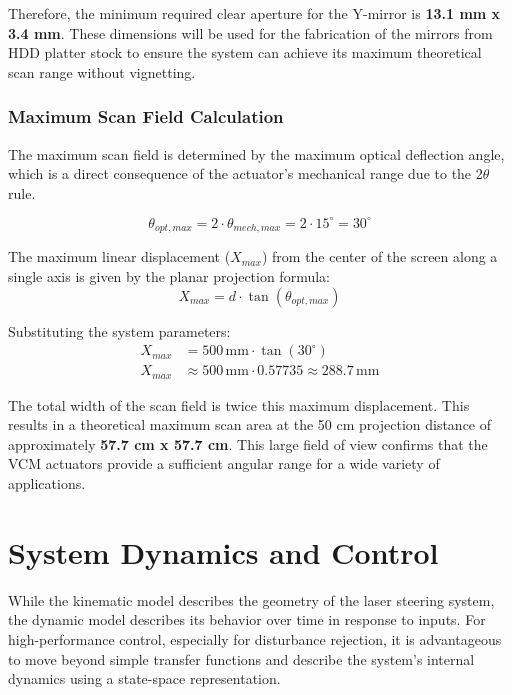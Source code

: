 \documentclass[12pt]{article}
\begin{document}
Therefore, the minimum required clear aperture for the Y-mirror is \textbf{13.1 mm x 3.4 mm}. These dimensions will be used for the fabrication of the mirrors from HDD platter stock to ensure the system can achieve its maximum theoretical scan range without vignetting.

\subsubsection{Maximum Scan Field Calculation}
The maximum scan field is determined by the maximum optical deflection angle, which is a direct consequence of the actuator's mechanical range due to the 2\(\theta\) rule.

\begin{equation}
\theta_{opt,max} = 2 \cdot \theta_{mech,max} = 2 \cdot 15^\circ = 30^\circ
\end{equation}

The maximum linear displacement (\(X_{max}\)) from the center of the screen along a single axis is given by the planar projection formula:
\begin{equation}
X_{max} = d \cdot \tan(\theta_{opt,max})
\end{equation}

Substituting the system parameters:
\begin{align}
X_{max} &= 500\,\text{mm} \cdot \tan(30^\circ) \\
X_{max} &\approx 500\,\text{mm} \cdot 0.57735 \approx 288.7\,\text{mm}
\end{align}

The total width of the scan field is twice this maximum displacement. This results in a theoretical maximum scan area at the 50 cm projection distance of approximately \textbf{57.7 cm x 57.7 cm}. This large field of view confirms that the VCM actuators provide a sufficient angular range for a wide variety of applications.

\newpage
\section{System Dynamics and Control}

While the kinematic model describes the geometry of the laser steering system, the dynamic model describes its behavior over time in response to inputs. For high-performance control, especially for disturbance rejection, it is advantageous to move beyond simple transfer functions and describe the system's internal dynamics using a state-space representation.
\end{document}
